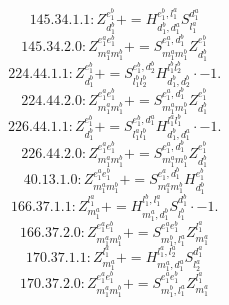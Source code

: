 \documentclass[letterpaper,10pt,fleqn,leqno,onecolumn]{article}
\begin{document}
\begin{equation} \;\;\;\;\;\;  145.34.1.1: Z^{e_{1}^{b}}_{d_{1}^{b}}+=H^{e_{1}^{b},l_{1}^{a}}_{d_{1}^{b},d_{1}^{a}}S^{d_{1}^{a}}_{l_{1}^{a}} \end{equation}
\begin{equation} \;\;\;\;\;\;  145.34.2.0: Z^{e_{1}^{a}e_{1}^{b}}_{m_{1}^{a}m_{1}^{b}}+=S^{e_{1}^{a},d_{1}^{b}}_{m_{1}^{a}m_{1}^{b}}Z^{e_{1}^{b}}_{d_{1}^{b}} \end{equation}
\begin{equation} \;\;\;\;\;\;  224.44.1.1: Z^{e_{1}^{b}}_{d_{1}^{b}}+=S^{e_{1}^{b},d_{2}^{b}}_{l_{1}^{b}l_{2}^{b}}H^{l_{1}^{b}l_{2}^{b}}_{d_{1}^{b},d_{2}^{b}}\cdot -1. \end{equation}
\begin{equation} \;\;\;\;\;\;  224.44.2.0: Z^{e_{1}^{a}e_{1}^{b}}_{m_{1}^{a}m_{1}^{b}}+=S^{e_{1}^{a},d_{1}^{b}}_{m_{1}^{a}m_{1}^{b}}Z^{e_{1}^{b}}_{d_{1}^{b}} \end{equation}
\begin{equation} \;\;\;\;\;\;  226.44.1.1: Z^{e_{1}^{b}}_{d_{1}^{b}}+=S^{e_{1}^{b},d_{1}^{a}}_{l_{1}^{a}l_{1}^{b}}H^{l_{1}^{a}l_{1}^{b}}_{d_{1}^{b},d_{1}^{a}}\cdot -1. \end{equation}
\begin{equation} \;\;\;\;\;\;  226.44.2.0: Z^{e_{1}^{a}e_{1}^{b}}_{m_{1}^{a}m_{1}^{b}}+=S^{e_{1}^{a},d_{1}^{b}}_{m_{1}^{a}m_{1}^{b}}Z^{e_{1}^{b}}_{d_{1}^{b}} \end{equation}
\begin{equation} \;\;\;\;\;\;  40.13.1.0: Z^{e_{1}^{a}e_{1}^{b}}_{m_{1}^{a}m_{1}^{b}}+=S^{e_{1}^{a},d_{1}^{b}}_{m_{1}^{a}m_{1}^{b}}H^{e_{1}^{b}}_{d_{1}^{b}} \end{equation}
\begin{equation} \;\;\;\;\;\;  166.37.1.1: Z^{l_{1}^{a}}_{m_{1}^{a}}+=H^{l_{1}^{b},l_{1}^{a}}_{m_{1}^{a},d_{1}^{b}}S^{d_{1}^{b}}_{l_{1}^{b}}\cdot -1. \end{equation}
\begin{equation} \;\;\;\;\;\;  166.37.2.0: Z^{e_{1}^{a}e_{1}^{b}}_{m_{1}^{a}m_{1}^{b}}+=S^{e_{1}^{a}e_{1}^{b}}_{m_{1}^{b},l_{1}^{a}}Z^{l_{1}^{a}}_{m_{1}^{a}} \end{equation}
\begin{equation} \;\;\;\;\;\;  170.37.1.1: Z^{l_{1}^{a}}_{m_{1}^{a}}+=H^{l_{1}^{a},l_{2}^{a}}_{m_{1}^{a},d_{1}^{a}}S^{d_{1}^{a}}_{l_{2}^{a}} \end{equation}
\begin{equation} \;\;\;\;\;\;  170.37.2.0: Z^{e_{1}^{a}e_{1}^{b}}_{m_{1}^{a}m_{1}^{b}}+=S^{e_{1}^{a}e_{1}^{b}}_{m_{1}^{b},l_{1}^{a}}Z^{l_{1}^{a}}_{m_{1}^{a}} \end{equation}
\end{document}
